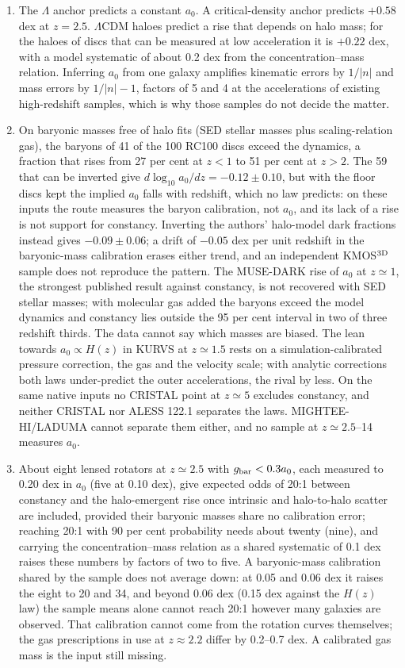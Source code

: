 \documentclass[fleqn,usenatbib]{mnras}
\begin{document}
\begin{enumerate}
\item The $\Lambda$ anchor predicts a constant $a_0$. A critical-density anchor predicts $+0.58$ dex at $z=2.5$. $\Lambda$CDM haloes predict a rise that depends on halo mass; for the haloes of discs that can be measured at low acceleration it is $+0.22$ dex, with a model systematic of about 0.2 dex from the concentration--mass relation. Inferring $a_0$ from one galaxy amplifies kinematic errors by $1/|n|$ and mass errors by $1/|n|-1$, factors of 5 and 4 at the accelerations of existing high-redshift samples, which is why those samples do not decide the matter.
\item On baryonic masses free of halo fits (SED stellar masses plus scaling-relation gas), the baryons of 41 of the 100 RC100 discs exceed the dynamics, a fraction that rises from 27 per cent at $z<1$ to 51 per cent at $z>2$. The 59 that can be inverted give $d\log_{10}a_0/dz=-0.12\pm0.10$, but with the floor discs kept the implied $a_0$ falls with redshift, which no law predicts: on these inputs the route measures the baryon calibration, not $a_0$, and its lack of a rise is not support for constancy. Inverting the authors' halo-model dark fractions instead gives $-0.09\pm0.06$; a drift of $-0.05$ dex per unit redshift in the baryonic-mass calibration erases either trend, and an independent KMOS$^{\rm 3D}$ sample does not reproduce the pattern. The MUSE-DARK rise of $a_0$ at $z\simeq1$, the strongest published result against constancy, is not recovered with SED stellar masses; with molecular gas added the baryons exceed the model dynamics and constancy lies outside the 95 per cent interval in two of three redshift thirds. The data cannot say which masses are biased. The lean towards $a_0\propto H(z)$ in KURVS at $z\simeq1.5$ rests on a simulation-calibrated pressure correction, the gas and the velocity scale; with analytic corrections both laws under-predict the outer accelerations, the rival by less. On the same native inputs no CRISTAL point at $z\simeq5$ excludes constancy, and neither CRISTAL nor ALESS 122.1 separates the laws. MIGHTEE-HI/LADUMA cannot separate them either, and no sample at $z\simeq2.5$--14 measures $a_0$.
\item About eight lensed rotators at $z\simeq2.5$ with $g_{\rm bar}<0.3a_0$, each measured to 0.20 dex in $a_0$ (five at 0.10 dex), give expected odds of 20:1 between constancy and the halo-emergent rise once intrinsic and halo-to-halo scatter are included, provided their baryonic masses share no calibration error; reaching 20:1 with 90 per cent probability needs about twenty (nine), and carrying the concentration--mass relation as a shared systematic of 0.1 dex raises these numbers by factors of two to five. A baryonic-mass calibration shared by the sample does not average down: at 0.05 and 0.06 dex it raises the eight to 20 and 34, and beyond 0.06 dex (0.15 dex against the $H(z)$ law) the sample means alone cannot reach 20:1 however many galaxies are observed. That calibration cannot come from the rotation curves themselves; the gas prescriptions in use at $z\approx2.2$ differ by 0.2--0.7 dex. A calibrated gas mass is the input still missing.
\end{enumerate}
\end{document}

